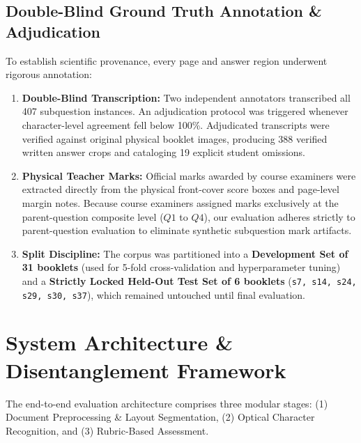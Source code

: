 \documentclass[journal]{IEEEtran}
\begin{document}
\subsection{Double-Blind Ground Truth Annotation \& Adjudication}
To establish scientific provenance, every page and answer region underwent rigorous annotation:
\begin{enumerate}
    \item \textbf{Double-Blind Transcription:} Two independent annotators transcribed all 407 subquestion instances. An adjudication protocol was triggered whenever character-level agreement fell below 100\%. Adjudicated transcripts were verified against original physical booklet images, producing 388 verified written answer crops and cataloging 19 explicit student omissions.
    \item \textbf{Physical Teacher Marks:} Official marks awarded by course examiners were extracted directly from the physical front-cover score boxes and page-level margin notes. Because course examiners assigned marks exclusively at the parent-question composite level ($Q1$ to $Q4$), our evaluation adheres strictly to parent-question evaluation to eliminate synthetic subquestion mark artifacts.
    \item \textbf{Split Discipline:} The corpus was partitioned into a \textbf{Development Set of 31 booklets} (used for 5-fold cross-validation and hyperparameter tuning) and a \textbf{Strictly Locked Held-Out Test Set of 6 booklets} (\texttt{s7, s14, s24, s29, s30, s37}), which remained untouched until final evaluation.
\end{enumerate}

\section{System Architecture \& Disentanglement Framework}
The end-to-end evaluation architecture comprises three modular stages: (1) Document Preprocessing \& Layout Segmentation, (2) Optical Character Recognition, and (3) Rubric-Based Assessment.
\end{document}
